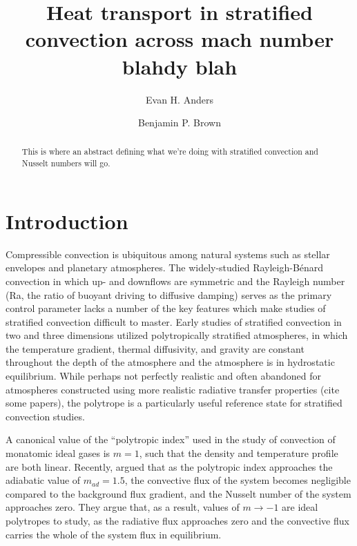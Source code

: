 \documentclass[aps, prl, twocolumn, groupedaddress]{revtex4-1}
\newcommand{\RB}{Rayleigh-B\'{e}nard }
\begin{document}
\author{Evan H. Anders}
\author{Benjamin P. Brown}
\title{Heat transport in stratified convection across mach number blahdy blah}

\begin{abstract}
This is where an abstract defining what we're doing with stratified convection and Nusselt numbers will go.
\end{abstract}
\maketitle


\section{Introduction \label{section:intro}}
Compressible convection is ubiquitous among natural systems such as stellar envelopes and planetary atmospheres.
The widely-studied \RB convection in which up- and downflows are symmetric and the Rayleigh number (Ra, the
ratio of buoyant driving to diffusive damping) serves as the primary control parameter lacks a number of the
key features which make studies of stratified convection difficult to master.  Early studies of stratified
convection in two \cite{graham1975, chan&all1982, hurlburt&all1984, cattaneo&all1990} and three 
\cite{malagoli&all1990, cattaneo&all1991, brummell&all1996} dimensions
utilized polytropically stratified atmospheres, in which the temperature gradient, thermal diffusivity, and
gravity are constant throughout the depth of the atmosphere and the atmosphere is in hydrostatic equilibrium.
While perhaps not perfectly realistic and often abandoned for atmospheres constructed using more realistic
radiative transfer properties (cite some papers), the polytrope is a particularly useful reference state for
stratified convection studies.

A canonical value of the ``polytropic index'' used in the study of convection of monatomic ideal gases is
$m = 1$, such that the density and temperature profile are both linear.  Recently, \cite{brandenburg&all2005}
argued that as the polytropic index approaches the adiabatic value of $m_{ad} = 1.5$, the convective flux of
the system becomes negligible compared to the background flux gradient, and the Nusselt number of the
system approaches zero.  They argue that, as a result, values of $m \rightarrow -1$ are ideal polytropes
to study, as the radiative flux approaches zero and the convective flux carries the whole of the system
flux in equilibrium. 
\end{document}
